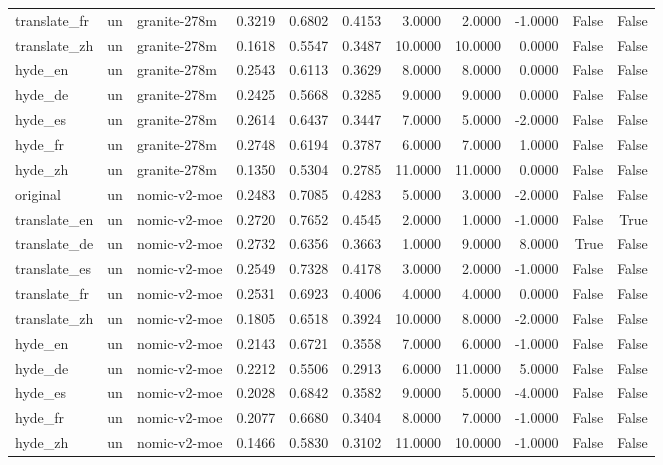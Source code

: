 \begin{tabular}{lllrrrrrrrr}
translate\_fr & un & granite-278m & 0.3219 & 0.6802 & 0.4153 & 3.0000 & 2.0000 & -1.0000 & False & False \\
translate\_zh & un & granite-278m & 0.1618 & 0.5547 & 0.3487 & 10.0000 & 10.0000 & 0.0000 & False & False \\
hyde\_en & un & granite-278m & 0.2543 & 0.6113 & 0.3629 & 8.0000 & 8.0000 & 0.0000 & False & False \\
hyde\_de & un & granite-278m & 0.2425 & 0.5668 & 0.3285 & 9.0000 & 9.0000 & 0.0000 & False & False \\
hyde\_es & un & granite-278m & 0.2614 & 0.6437 & 0.3447 & 7.0000 & 5.0000 & -2.0000 & False & False \\
hyde\_fr & un & granite-278m & 0.2748 & 0.6194 & 0.3787 & 6.0000 & 7.0000 & 1.0000 & False & False \\
hyde\_zh & un & granite-278m & 0.1350 & 0.5304 & 0.2785 & 11.0000 & 11.0000 & 0.0000 & False & False \\
original & un & nomic-v2-moe & 0.2483 & 0.7085 & 0.4283 & 5.0000 & 3.0000 & -2.0000 & False & False \\
translate\_en & un & nomic-v2-moe & 0.2720 & 0.7652 & 0.4545 & 2.0000 & 1.0000 & -1.0000 & False & True \\
translate\_de & un & nomic-v2-moe & 0.2732 & 0.6356 & 0.3663 & 1.0000 & 9.0000 & 8.0000 & True & False \\
translate\_es & un & nomic-v2-moe & 0.2549 & 0.7328 & 0.4178 & 3.0000 & 2.0000 & -1.0000 & False & False \\
translate\_fr & un & nomic-v2-moe & 0.2531 & 0.6923 & 0.4006 & 4.0000 & 4.0000 & 0.0000 & False & False \\
translate\_zh & un & nomic-v2-moe & 0.1805 & 0.6518 & 0.3924 & 10.0000 & 8.0000 & -2.0000 & False & False \\
hyde\_en & un & nomic-v2-moe & 0.2143 & 0.6721 & 0.3558 & 7.0000 & 6.0000 & -1.0000 & False & False \\
hyde\_de & un & nomic-v2-moe & 0.2212 & 0.5506 & 0.2913 & 6.0000 & 11.0000 & 5.0000 & False & False \\
hyde\_es & un & nomic-v2-moe & 0.2028 & 0.6842 & 0.3582 & 9.0000 & 5.0000 & -4.0000 & False & False \\
hyde\_fr & un & nomic-v2-moe & 0.2077 & 0.6680 & 0.3404 & 8.0000 & 7.0000 & -1.0000 & False & False \\
hyde\_zh & un & nomic-v2-moe & 0.1466 & 0.5830 & 0.3102 & 11.0000 & 10.0000 & -1.0000 & False & False \\

\end{tabular}
